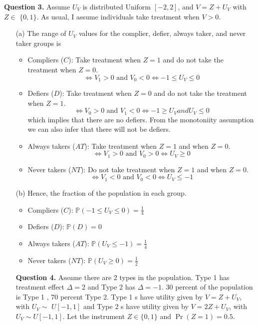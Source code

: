 \documentclass{article}
\theoremstyle{definition}
\begin{document}
     
    \noindent \hspace{0.41cm} \textbf{Question 3.}  Assume $U_{V}$ is distributed Uniform $[-2,2]$, and $V=Z+U_{V}$ with $Z \in$ $\{0,1\}$. As usual, I assume individuals take treatment when $V>0$.
    \begin{itemize}
        \item[(a)] The range of $U_{V}$ values for the complier, defier, always taker, and never taker groups is
        \begin{itemize}
            \item Compliers ($C$): Take treatment when $Z=1$ and do not take the treatment when $Z=0$.
            $$\iff V_1>0 \text{ and } V_0<0 \iff -1 \leq U_V \leq 0 $$
             \item Defiers ($D$): Take treatment when $Z=0$ and do not take the treatment when $Z=1$.
            $$\iff V_0>0 \text{ and } V_1<0 \iff -1 \geq U_V { and } U_V \leq 0 $$
            which implies that there are no defiers. From the monotoniity assumption we can also infer that there will not be defiers.
            \item Always takers ($AT$): Take treatment when $Z=1$ and when $Z=0$.
            $$\iff V_1>0 \text{ and } V_0>0 \iff U_V \geq 0 $$
            \item Never takers ($NT$): Do not take treatment when $Z=1$ and when $Z=0$.
            $$\iff V_1<0 \text{ and } V_0<0 \iff U_V \leq -1 $$
            
            
        \end{itemize}
\item[(b)] Hence, the fraction of the population in each group.

        \begin{itemize}
            \item Compliers ($C$): $\mathbb{P}(-1 \leq U_V \leq 0 ) = \frac{1}{4}$
             \item Defiers ($D$): $\mathbb{P}(D) = 0$
            \item Always takers ($AT$): $\mathbb{P}(U_V\leq -1) = \frac{1}{4}$
            \item Never takers ($NT$):  $\mathbb{P}( U_V\geq 0 ) = \frac{1}{2}$
            
    \end{itemize}
    
          
    \noindent \hspace{0.41cm} \textbf{Question 4.}  Assume there are 2 types in the population. Type 1 has treatment effect $\Delta=2$ and Type 2 has $\Delta=-1$. 30 percent of the population is Type 1 , 70 percent Type 2. Type 1 s have utility given by $V=Z+U_{V}$, with $U_{V} \sim$ $U[-1,1]$ and Type 2 s have utility given by $V=2 Z+U_{V}$, with $U_{V} \sim U[-1,1]$. Let the instrument $Z \in\{0,1\}$ and $\operatorname{Pr}(Z=1)=0.5$.
               

\end{itemize}
\end{document}
